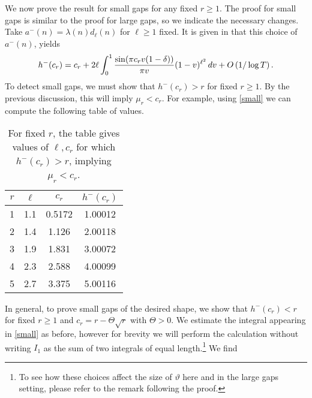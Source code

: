 \documentclass[oneside]{amsart}
\begin{document}
We now prove the result for small gaps for any fixed $r\ge1$. The proof for small gaps is similar to the proof for large gaps, so we indicate the necessary changes. Take $a^-(n) = \lambda(n)d_\ell(n)$ for $\ell \ge 1$ fixed. It is given in \cite[p.422]{CGG84} that this choice of $a^-(n)$, yields
\begin{equation}\label{small}
h^-(c_r) = c_r +2\ell \int_{0}^{1}\frac{\sin(\pi c_r v(1-\delta))}{\pi v}(1-v)^{\ell^2}\,dv +O\left(1/\log T\right).\\
\end{equation}
To detect small gaps, we must show that $h^-(c_r) > r$ for fixed $r\ge 1$. By the previous discussion, this will imply $\mu_r < c_r$.  For example, using \eqref{small} we can compute the following table of values.


\begin{table}[h]
\centering
\begin{tabular}{ |c|c|c|c| } 
 \hline
$r$	&	$\ell$	&	$c_r$ 	&	$h^-(c_r)$\\ 
\hline
1	& 	1.1		&	0.5172	&	1.00012\\
2	&	1.4		&	1.126	&	2.00118\\
3	&	1.9		&	1.831	&	3.00072\\
4	&	2.3		&	2.588	&	4.00099\\
5	&	2.7		&	3.375	&	5.00116 \\
 \hline
\end{tabular}
\caption{For fixed $r$, the table gives values of $\ell,c_r$ for which $h^-(c_r) > r$, implying $\mu_r < c_r$.}
\label{figure: table example}
\end{table}


In general, to prove small gaps of the desired shape, we show that $h^-(c_r) < r$ for fixed $r\ge 1$ and $c_r = r - \Theta\sqrt{r}$ with $\Theta>0$. We estimate the integral appearing in \eqref{small} as before, however for brevity we will perform the calculation without writing $I_1$ as the sum of two integrals of equal length.\footnote{To see how these choices affect the size of $\vartheta$ here and in the large gaps setting, please refer to the remark following the proof.} We find
\end{document}
